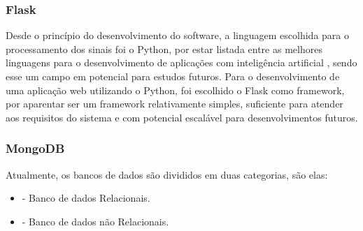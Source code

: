 \subsubsection{Flask}

Desde o princípio do desenvolvimento do software, a linguagem escolhida para o processamento dos sinais foi o Python, por estar listada entre as melhores linguagens para o desenvolvimento de aplicações com inteligência artificial \cite{bestProgrammingLanguagesForAI2020}, sendo esse um campo em potencial para estudos futuros. Para o desenvolvimento de uma aplicação web utilizando o Python,  foi escolhido o Flask \cite{Flask} como framework, por aparentar ser um framework relativamente simples, suficiente para atender aos requisitos do sistema e com potencial escalável para desenvolvimentos futuros.

\subsubsection{MongoDB}

Atualmente, os bancos de dados são divididos em duas categorias, são elas:
\begin{itemize}[label=]
	\item - Banco de dados Relacionais.
	\item - Banco de dados não Relacionais.
\end{itemize}

